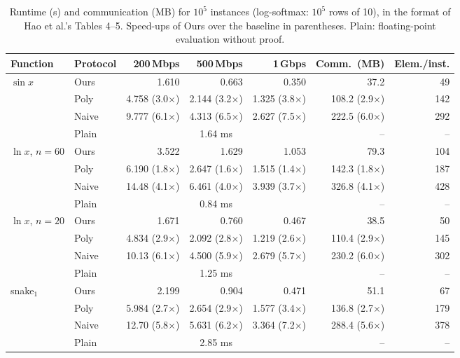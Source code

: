 \begin{table}[t]\centering\small
\caption{Runtime (s) and communication (MB) for $10^5$ instances (log-softmax: $10^5$ rows of 10), in the format of Hao et al.'s Tables 4--5. Speed-ups of \textsf{Ours} over the baseline in parentheses. \textsf{Plain}: floating-point evaluation without proof.}
\label{tab:main}
\begin{tabular}{llrrrrr}\toprule
Function & Protocol & 200\,Mbps & 500\,Mbps & 1\,Gbps & Comm.\ (MB) & Elem./inst.\\\midrule
$\sin x$ & \textsf{Ours} & 1.610 & 0.663 & 0.350 & 37.2 & 49\\
 & \textsf{Poly} & 4.758 (3.0$\times$) & 2.144 (3.2$\times$) & 1.325 (3.8$\times$) & 108.2 (2.9$\times$) & 142\\
 & \textsf{Naive} & 9.777 (6.1$\times$) & 4.313 (6.5$\times$) & 2.627 (7.5$\times$) & 222.5 (6.0$\times$) & 292\\
 & \textsf{Plain} & \multicolumn{3}{c}{1.64 ms} & -- & --\\
\midrule
$\ln x$, $n{=}60$ & \textsf{Ours} & 3.522 & 1.629 & 1.053 & 79.3 & 104\\
 & \textsf{Poly} & 6.190 (1.8$\times$) & 2.647 (1.6$\times$) & 1.515 (1.4$\times$) & 142.3 (1.8$\times$) & 187\\
 & \textsf{Naive} & 14.48 (4.1$\times$) & 6.461 (4.0$\times$) & 3.939 (3.7$\times$) & 326.8 (4.1$\times$) & 428\\
 & \textsf{Plain} & \multicolumn{3}{c}{0.84 ms} & -- & --\\
\midrule
$\ln x$, $n{=}20$ & \textsf{Ours} & 1.671 & 0.760 & 0.467 & 38.5 & 50\\
 & \textsf{Poly} & 4.834 (2.9$\times$) & 2.092 (2.8$\times$) & 1.219 (2.6$\times$) & 110.4 (2.9$\times$) & 145\\
 & \textsf{Naive} & 10.13 (6.1$\times$) & 4.500 (5.9$\times$) & 2.679 (5.7$\times$) & 230.2 (6.0$\times$) & 302\\
 & \textsf{Plain} & \multicolumn{3}{c}{1.25 ms} & -- & --\\
\midrule
snake$_1$ & \textsf{Ours} & 2.199 & 0.904 & 0.471 & 51.1 & 67\\
 & \textsf{Poly} & 5.984 (2.7$\times$) & 2.654 (2.9$\times$) & 1.577 (3.4$\times$) & 136.8 (2.7$\times$) & 179\\
 & \textsf{Naive} & 12.70 (5.8$\times$) & 5.631 (6.2$\times$) & 3.364 (7.2$\times$) & 288.4 (5.6$\times$) & 378\\
 & \textsf{Plain} & \multicolumn{3}{c}{2.85 ms} & -- & --\\

\end{tabular}
\end{table}
